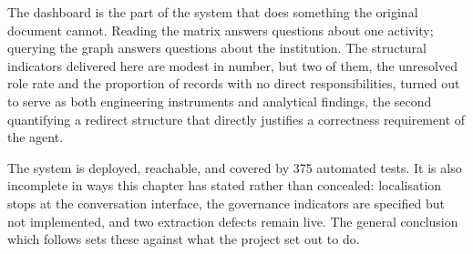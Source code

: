 The dashboard is the part of the system that does something the original document cannot.
Reading the matrix answers questions about one activity; querying the graph answers
questions about the institution. The structural indicators delivered here are modest in
number, but two of them, the unresolved role rate and the proportion of records with no
direct responsibilities, turned out to serve as both engineering instruments and
analytical findings, the second quantifying a redirect structure that directly justifies a
correctness requirement of the agent.

The system is deployed, reachable, and covered by 375 automated tests. It is also
incomplete in ways this chapter has stated rather than concealed: localisation stops at
the conversation interface, the governance indicators are specified but not implemented,
and two extraction defects remain live. The general conclusion which follows sets these
against what the project set out to do.
